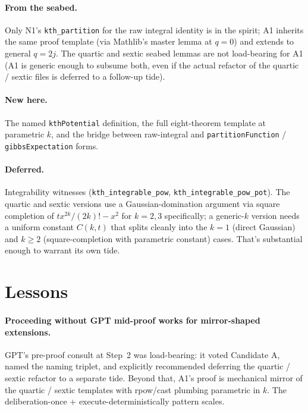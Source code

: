 \documentclass[11pt]{article}
\begin{document}
\paragraph{From the seabed.} Only N1's \texttt{kth\_partition} for
the raw integral identity is in the spirit; A1 inherits the same
proof template (via Mathlib's master lemma at $q = 0$) and extends
to general $q = 2j$. The quartic and sextic seabed lemmas are not
load-bearing for A1 (A1 is generic enough to subsume both, even if
the actual refactor of the quartic / sextic files is deferred to a
follow-up tide).

\paragraph{New here.} The named \texttt{kthPotential} definition,
the full eight-theorem template at parametric $k$, and the bridge
between raw-integral and \texttt{partitionFunction} /
\texttt{gibbsExpectation} forms.

\paragraph{Deferred.} Integrability witnesses
(\texttt{kth\_integrable\_pow}, \texttt{kth\_integrable\_pow\_pot}).
The quartic and sextic versions use a Gaussian-domination argument
via square completion of $tx^{2k}/(2k)! - x^2$ for $k = 2, 3$
specifically; a generic-$k$ version needs a uniform constant
$C(k, t)$ that splits cleanly into the $k = 1$ (direct Gaussian)
and $k \ge 2$ (square-completion with parametric constant) cases.
That's substantial enough to warrant its own tide.

\section{Lessons}

\paragraph{Proceeding without GPT mid-proof works for mirror-shaped
extensions.} GPT's pre-proof consult at Step~2 was load-bearing: it
voted Candidate A, named the naming triplet, and explicitly
recommended deferring the quartic / sextic refactor to a separate
tide. Beyond that, A1's proof is mechanical mirror of the quartic /
sextic templates with rpow/cast plumbing parametric in $k$. The
deliberation-once + execute-deterministically pattern scales.
\end{document}
